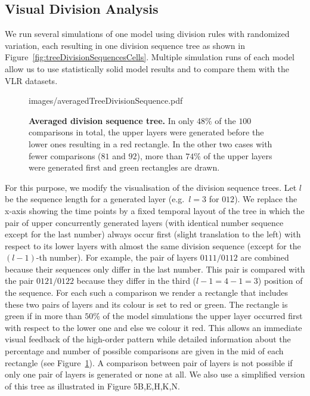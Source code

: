 \documentclass[11pt,a4paper, final]{article}
\begin{document}
\subsection{Visual Division Analysis}
\noindent
We run several simulations of one model using division rules with randomized variation, each resulting in one division sequence tree as shown in Figure~\ref{fig:treeDivisionSequencesCells}. Multiple simulation runs of each model allow us to use statistically solid model results and to compare them with the VLR datasets.
%
\begin{figure}[htbp]
	\begin{center}
		\begin{overpic}[width=0.4\linewidth]{images/averagedTreeDivisionSequence.pdf}
		\end{overpic}
\caption[]
{
{\bf Averaged division sequence tree.} In only $48 \%$ of the $100$ comparisons in total, the upper layers were generated before the lower ones resulting in a red rectangle. In the other two cases with fewer comparisons ($81$ and $92$), more than $74 \%$ of the upper layers were generated first and green rectangles are drawn.
}
	\label{fig:averagedTreeDivisionSequence}
	\end{center}
\end{figure}
%
For this purpose, we modify the visualisation of the division sequence trees. Let $l$ be the sequence length for a generated layer (e.g.\ $l=3$ for $012$). We replace the x-axis showing the time points by a fixed temporal layout of the tree in which the pair of upper concurrently generated layers (with identical number sequence except for the last number) always occur first (slight translation to the left) with respect to its lower layers with almost the same division sequence (except for the $(l-1)$-th number). For example, the pair of layers $0111/0112$ are combined because their sequences only differ in the last number. This pair is compared with the pair $0121/0122$ because they differ in the third ($l-1 = 4-1 = 3$) position of the sequence. For each such a comparison we render a rectangle that includes these two pairs of layers and its colour is set to red or green. The rectangle is green if in more than $50 \%$ of the model simulations the upper layer occurred first with respect to the lower one and else we colour it red. This allows an immediate visual feedback of the high-order pattern while detailed information about the percentage and number of possible comparisons are given in the mid of each rectangle (see Figure~\ref{fig:averagedTreeDivisionSequence}). A comparison between pair of layers is not possible if only one pair of layers is generated or none at all. We also use a simplified version of this tree as illustrated in Figure 5B,E,H,K,N.
\end{document}
